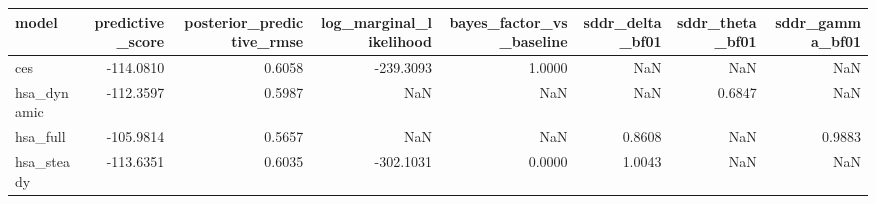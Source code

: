 \begin{tabular}{lrrrrrrr}
\toprule
model & predictive\_score & posterior\_predictive\_rmse & log\_marginal\_likelihood & bayes\_factor\_vs\_baseline & sddr\_delta\_bf01 & sddr\_theta\_bf01 & sddr\_gamma\_bf01 \\
\midrule
ces & -114.0810 & 0.6058 & -239.3093 & 1.0000 & NaN & NaN & NaN \\
hsa\_dynamic & -112.3597 & 0.5987 & NaN & NaN & NaN & 0.6847 & NaN \\
hsa\_full & -105.9814 & 0.5657 & NaN & NaN & 0.8608 & NaN & 0.9883 \\
hsa\_steady & -113.6351 & 0.6035 & -302.1031 & 0.0000 & 1.0043 & NaN & NaN \\
\bottomrule
\end{tabular}
